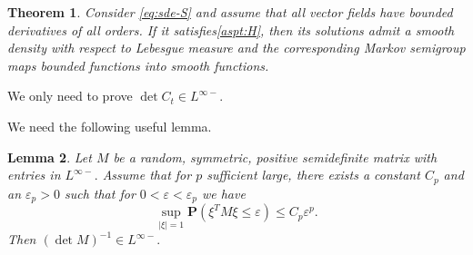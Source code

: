\documentclass[twoside, 12pt]{book}
\numberwithin{equation}{chapter}
\newtheorem{theorem}{Theorem}[section]
\newtheorem{lemma}[theorem]{Lemma}
\def\bP{{\mathbf P}}
\def\<{\langle}
\def\>{\rangle}
\def\leq{\leqslant}
\def\d{\text{\rm{d}}}
\def\eps{\varepsilon}
\begin{document}
	\begin{theorem}
	Consider \eqref{eq:sde-S} and assume that all vector fields have bounded derivatives of all orders. If it satisfies\eqref{aspt:H}, then its solutions admit a smooth density with respect to Lebesgue measure and the corresponding Markov semigroup maps bounded functions into smooth functions.
	\end{theorem}
	
	We only need to prove $\det C_t\in L^{\infty-}$. 
	
	We need the following useful lemma. 
	
	\begin{lemma}\label{Tail}
	Let $M$ be a random, symmetric, positive semidefinite matrix with entries in  $L^{\infty-}.$ Assume that for $p$ sufficient large, there exists a constant $C_p$ and an $\eps_p > 0$ such that
	for $0<\eps<\eps_p$ we have
	$$ \sup_{|\xi|=1}\bP  (\xi^T M \xi\leq \eps)\leq C_p \eps^p. $$
	Then $(\det M)^{-1} \in L^{\infty-}. $
	\end{lemma}
	
\end{document}
